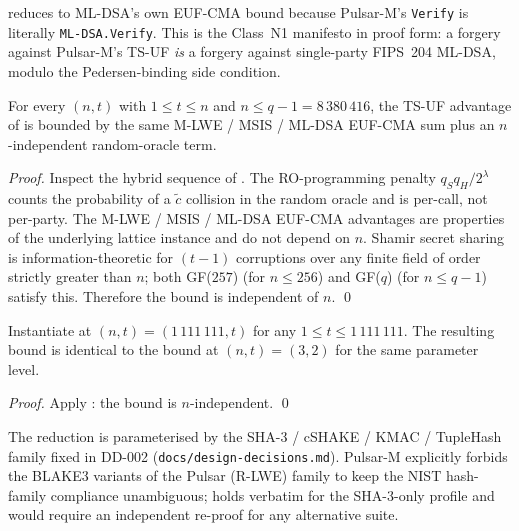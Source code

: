 \begin{remark}
\label{rem:pulsar-m-output-interchange}
 reduces to ML-DSA's own EUF-CMA bound
because Pulsar-M's \texttt{Verify} is literally \texttt{ML-DSA.Verify}.
This is the Class~N1 manifesto in proof form: a forgery against
Pulsar-M's TS-UF \emph{is} a forgery against single-party FIPS~204
ML-DSA, modulo the Pedersen-binding side condition.
\end{remark}

\begin{theorem}
\label{thm:pulsar-m-scales-n}
For every $(n, t)$ with $1 \le t \le n$ and $n \le q - 1 =
8\,380\,416$, the TS-UF advantage of  is
bounded by the same M-LWE / MSIS / ML-DSA EUF-CMA sum plus an
$n$-independent random-oracle term.
\end{theorem}

\begin{proof}
Inspect the hybrid sequence of . The
RO-programming penalty $q_S q_H / 2^\lambda$ counts the probability
of a $\tilde c$ collision in the random oracle and is per-call, not
per-party. The M-LWE / MSIS / ML-DSA EUF-CMA advantages are
properties of the underlying lattice instance and do not depend on
$n$. Shamir secret sharing is information-theoretic for $(t-1)$
corruptions over any finite field of order strictly greater than
$n$; both GF($257$) (for $n \le 256$) and GF($q$) (for $n \le q-1$)
satisfy this. Therefore the bound is independent of $n$. \qed
\end{proof}

\begin{corollary}[Pulsar-M at $N^* = 1\,111\,111$ is as secure as Pulsar-M at $(n, t) = (3, 2)$]
\label{cor:pulsar-m-extreme-committee}
Instantiate  at $(n, t) = (1\,111\,111, t)$
for any $1 \le t \le 1\,111\,111$. The resulting bound is identical
to the bound at $(n, t) = (3, 2)$ for the same parameter level.
\end{corollary}

\begin{proof}
Apply : the bound is $n$-independent.
\qed
\end{proof}

\begin{remark}
\label{rem:pulsar-m-hash-suite-invariance}
The reduction is parameterised by the SHA-3 / cSHAKE / KMAC / TupleHash
family fixed in DD-002 (\texttt{docs/design-decisions.md}). Pulsar-M
explicitly forbids the BLAKE3 variants of the Pulsar (R-LWE) family
to keep the NIST hash-family compliance unambiguous; 
holds verbatim for the SHA-3-only profile and would require an
independent re-proof for any alternative suite.
\end{remark}

